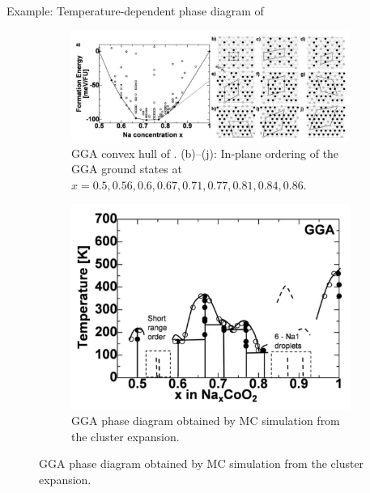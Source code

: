\documentclass[aspectratio=169]{beamer}
\begin{document}
\begin{frame}{Example: Temperature-dependent phase diagram of }
\begin{figure}
    \centering
    \begin{subfigure}{0.55\textwidth}
        \centering
        \includegraphics[width=\linewidth]{lectures/figures/10_NCO_PD.png}
    \caption{GGA convex hull of . (b)–(j): In-plane ordering of the GGA ground states at $x = 0.5, 0.56, 0.6, 0.67, 0.71, 0.77, 0.81, 0.84, 0.86$.}
    \end{subfigure}
    \begin{subfigure}{0.4\textwidth}
        \centering
        \includegraphics[width=\linewidth]{lectures/figures/10_NCO_CE_PD.png}
    \caption{GGA phase diagram obtained by MC simulation from the cluster expansion.\cite{hinumaTemperatureconcentrationPhaseDiagram2008}}
    \end{subfigure}
\end{figure} 
\end{frame} 
\end{document}
